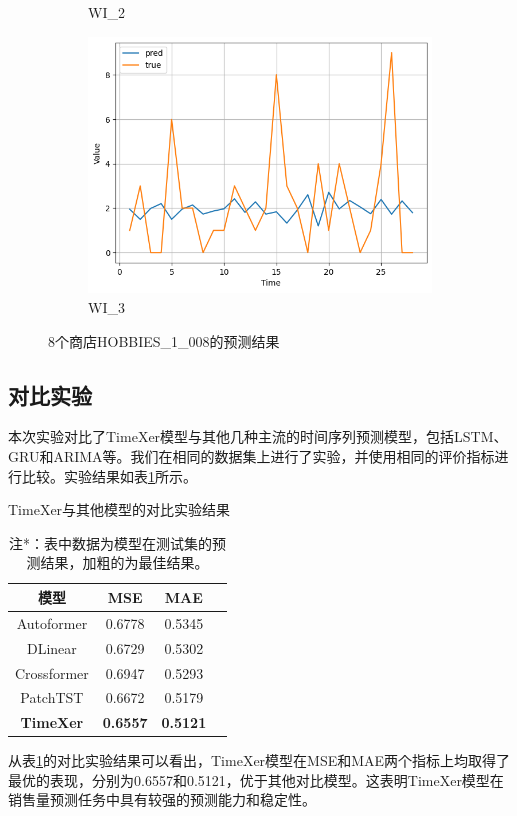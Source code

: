 \documentclass[12pt]{article}
\begin{document}
\begin{figure}[H]
\begin{subfigure}[b]{0.2\textwidth}
        \caption{WI\_2}
        \label{fig:output7}
    \end{subfigure}
    \begin{subfigure}[b]{0.2\textwidth}
        \includegraphics[width=\textwidth]{image/output8.png}
        \caption{WI\_3}
        \label{fig:output8}
    \end{subfigure}
    \caption{8个商店HOBBIES\_1\_008的预测结果}
    \label{fig:8subplots}
\end{figure}
\subsection{对比实验}
本次实验对比了TimeXer模型与其他几种主流的时间序列预测模型，包括LSTM、GRU和ARIMA等。我们在相同的数据集上进行了实验，并使用相同的评价指标进行比较。实验结果如表\ref{tab:compare}所示。
\begin{table}[H]
    \centering
    \caption{TimeXer与其他模型的对比实验结果}
    \label{tab:compare}
    \begin{tabular}{|c|c|c|c|}
        \hline
        \textbf{模型} & \textbf{MSE} & \textbf{MAE} \\
        \hline
        Autoformer & 0.6778 & 0.5345  \\
        \hline
        DLinear & 0.6729 & 0.5302 \\
        \hline
        Crossformer & 0.6947 & 0.5293  \\
        \hline
        PatchTST & 0.6672 & 0.5179 \\
        \hline
        \textbf{TimeXer} & \textbf{0.6557} & \textbf{0.5121}\\
        \hline
    \end{tabular}
    \caption*{注*：表中数据为模型在测试集的预测结果，加粗的为最佳结果。}
\end{table}
从表\ref{tab:compare}的对比实验结果可以看出，TimeXer模型在MSE和MAE两个指标上均取得了最优的表现，分别为0.6557和0.5121，优于其他对比模型。这表明TimeXer模型在销售量预测任务中具有较强的预测能力和稳定性。
\end{document}
